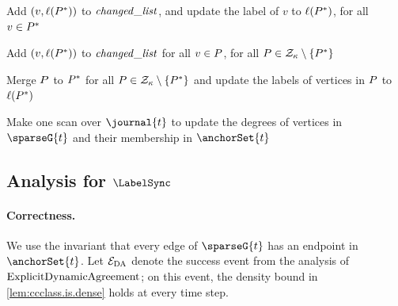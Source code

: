 \begin{algorithm}[htbp]
{{            Add $ (v, \ell(P^*)) $ to $ \changedList $, and update the label of $ v $ to $ \ell(P^*) $, for all $ v\in P^* $
        }

        Add $ (v, \ell(P^*)) $ to $ \changedList $ for all $ v\in P $, for all $ P \in\mathcal{Z}_\kappa\setminus\{P^*\} $ 

        Merge $ P $ to $ P^* $ for all $ P \in\mathcal{Z}_\kappa\setminus\{P^*\} $ and update the labels of vertices in $ P $ to $ \ell(P^*) $


    }

    \tcc{\ref{StepFourLabelSync}}
    Make one scan over $ \journal{t} $ to update the degrees of vertices in $ \sparseG{t} $ and their membership in $ \anchorSet{t} $

    \Return{$ \changedList $}
  \caption{$ \LabelSync $ at the end of update $ t $.}
  \label{alg.label.sync}
\end{algorithm}



\subsection{Analysis for \texorpdfstring{$ \LabelSync $}{LabelSync}}
\label{sub:analysis_for_labelsync}

\paragraph{Correctness.}
\label{par:correctness}
We use the invariant that every edge of $ \sparseG{t} $ has an endpoint in $ \anchorSet{t} $.
Let $ \mathcal{E}_{\rm DA} $ denote the success event from the analysis of $ \mathrm{ExplicitDynamicAgreement} $; on this event, the density bound in \cref{lem:ccclass.is.dense} holds at every time step.

